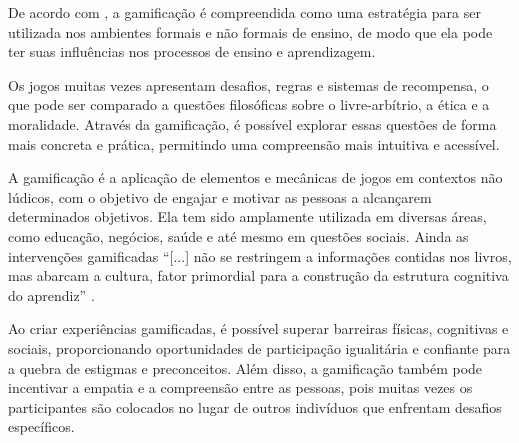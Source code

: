 

De acordo com , a gamificação é compreendida como uma estratégia para ser utilizada nos ambientes formais e não formais de ensino, de modo que ela pode ter suas influências nos processos de ensino e aprendizagem.

Os jogos muitas vezes apresentam desafios, regras e sistemas de recompensa, o que pode ser comparado a questões filosóficas sobre o livre-arbítrio, a ética e a moralidade. Através da gamificação, é possível explorar essas questões de forma mais concreta e prática, permitindo uma compreensão mais intuitiva e acessível.

A gamificação é a aplicação de elementos e mecânicas de jogos em contextos não lúdicos, com o objetivo de engajar e motivar as pessoas a alcançarem determinados objetivos. Ela tem sido amplamente utilizada em diversas áreas, como educação, negócios, saúde e até mesmo em questões sociais. Ainda as intervenções gamificadas ``[...] não se restringem a informações contidas nos livros, mas abarcam a cultura, fator primordial para a construção da estrutura cognitiva do aprendiz'' \cite[p. 17]{SILVAPIRES2020}.

Ao criar experiências gamificadas, é possível superar barreiras físicas, cognitivas e sociais, proporcionando oportunidades de participação igualitária e confiante para a quebra de estigmas e preconceitos. Além disso, a gamificação também pode incentivar a empatia e a compreensão entre as pessoas, pois muitas vezes os participantes são colocados no lugar de outros indivíduos que enfrentam desafios específicos.


